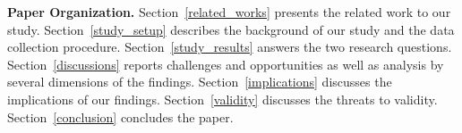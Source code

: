 \noindent\textbf{Paper Organization.} Section~\ref{related_works} presents the related work to our study.
Section~\ref{study_setup} describes the background of our study and the data
collection procedure. Section~\ref{study_results} answers the two research questions. Section~\ref{discussions} reports
challenges and opportunities as well as analysis by several dimensions of
the findings. Section~\ref{implications} discusses the
implications of our findings. Section~\ref{validity} discusses the threats to
validity. Section~\ref{conclusion} concludes the paper.
